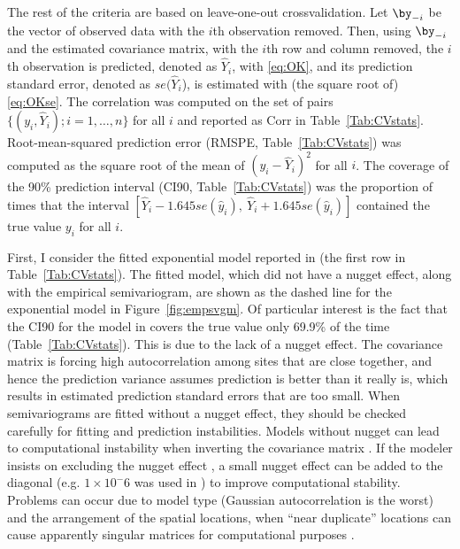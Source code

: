 The rest of the criteria are based on leave-one-out crossvalidation.  Let $\by_{-i}$ be the vector of observed data with the $i$th observation removed. Then, using $\by_{-i}$ and the estimated covariance matrix, with the $i$th row and column removed, the $i$th observation is predicted, denoted as $\hat{Y}_i$,  with \ref{eq:OK}, and its prediction standard error, denoted as $se(\hat{Y}_i$), is estimated with (the square root of) \ref{eq:OKse}. The correlation was computed on the set of pairs $\{(y_i,\hat{Y}_i); i = 1,\ldots,n \}$ for all $i$ and reported as Corr in Table~\ref{Tab:CVstats}.  Root-mean-squared prediction error (RMSPE, Table~\ref{Tab:CVstats}) was computed as the square root of the mean of $(y_i-\hat{Y}_i)^2$ for all $i$. The coverage of the 90\% prediction interval (CI90, Table~\ref{Tab:CVstats}) was the proportion of times that the interval $[\hat{Y}_i - 1.645 se(\hat{y}_i), \ \hat{Y}_i + 1.645 se(\hat{y}_i)]$ contained the true value $y_i$ for all $i$.

First, I consider the fitted exponential model reported in \citet{Ladl:Avga:Whea:Boyc:pred:2016} (the first row in Table~\ref{Tab:CVstats}).  The fitted model, which did not have a nugget effect, along with the empirical semivariogram, are shown as the dashed line for the exponential model in Figure~\ref{fig:empsvgm}.  Of particular interest is the fact that the CI90 for the model in \citet{Ladl:Avga:Whea:Boyc:pred:2016} covers the true value only 69.9\% of the time (Table~\ref{Tab:CVstats}). This is due to the lack of a nugget effect. The covariance matrix is forcing high autocorrelation among sites that are close together, and hence the prediction variance assumes prediction is better than it really is, which results in estimated prediction standard errors that are too small. When semivariograms are fitted without a nugget effect, they should be checked carefully for fitting and prediction instabilities. Models without nugget can lead to computational instability when inverting the covariance matrix \citep{Diam:Arms:robu:1984,Posa:cond:1989,ODow:cond:1991,Abab:cond:1994}. If the modeler insists on excluding the nugget effect \citep[as often occurs when using kriging to approximate deterministic computer models, e.g.][]{Mart:Simp:krig:2005}, a small nugget effect can be added to the diagonal (e.g. $1 \times 10^-6$ was used in \citet{Book:Denn:Fran:Sera:etal:rigo:1999}) to improve computational stability.  Problems can occur due to model type (Gaussian autocorrelation is the worst) and the arrangement of the spatial locations, when ``near duplicate'' locations can cause apparently singular matrices for computational purposes \citep[][p. 220]{Biva:Pebe:Gome:appl:2008}.

